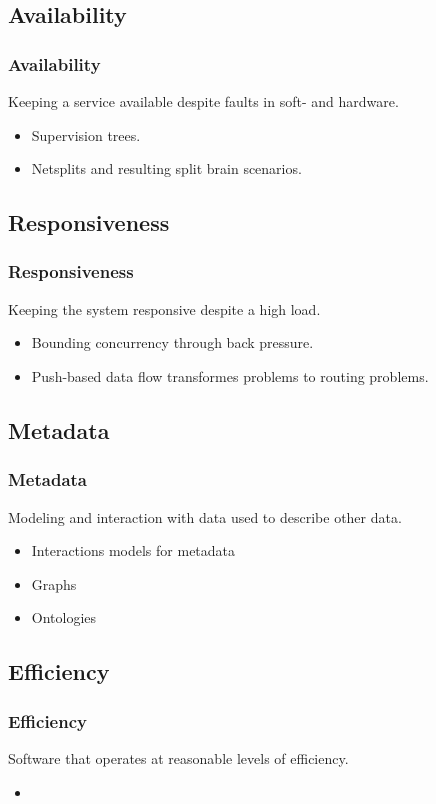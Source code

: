 \subsection{Availability}
\begin{frame}
    \frametitle{Availability}
    \vspace{0mm}
    Keeping a service available despite faults in soft- and hardware. 
    \vspace{3mm}
    \begin{itemize}
        \item Supervision trees.
        \item Netsplits and resulting split brain scenarios.
    \end{itemize}
\end{frame}

\subsection{Responsiveness}
\begin{frame}
    \frametitle{Responsiveness}
    \vspace{0mm}
    Keeping the system responsive despite a high load.
    \vspace{3mm}
    \begin{itemize}
        \item Bounding concurrency through back pressure.
        \item Push-based data flow transformes problems to routing problems.
    \end{itemize}
\end{frame}

\subsection{Metadata}
\begin{frame}
    \frametitle{Metadata}
    \vspace{0mm}
    Modeling and interaction with data used to describe other data.
    \vspace{3mm}
    \begin{itemize}
        \item Interactions models for metadata
        \item Graphs
        \item Ontologies
    \end{itemize}
\end{frame}

\subsection{Efficiency}
\begin{frame}
    \frametitle{Efficiency}
    \vspace{0mm}
    Software that operates at reasonable levels of efficiency.
    \vspace{3mm}
    \begin{itemize}
        \item
    \end{itemize}
\end{frame}

